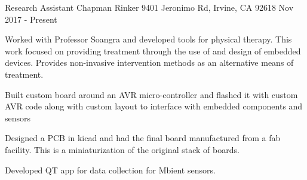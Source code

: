 

\begin{cventries}

  \cventry
    {Research Assistant} %
    {Chapman Rinker} %
    {9401 Jeronimo Rd, Irvine, CA 92618} %
    {Nov 2017 - Present} %
    {
      \begin{cvitems} %
        \item {Worked with Professor Soangra and developed tools for physical therapy. This work focused on providing treatment through the use of and design of embedded devices. Provides non-invasive intervention methods as an alternative means of treatment.}
        \item {Built custom board around an AVR micro-controller and flashed it with custom AVR code along with custom layout to interface with embedded components and sensors}
        \item {Designed a PCB in kicad and had the final board manufactured from a fab facility. This is a miniaturization of the original stack of boards.}
         \item {Developed QT app for data collection for Mbient sensors.}
      \end{cvitems}
    }


\end{cventries}
